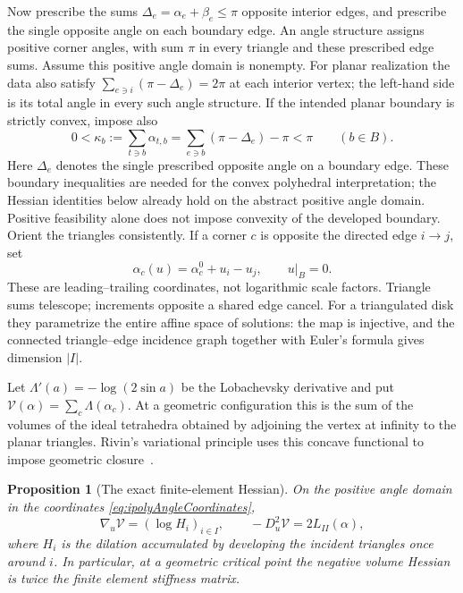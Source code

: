 \documentclass[11pt,a4paper]{article}
\numberwithin{equation}{section}
\newtheorem{proposition}[theorem]{Proposition}
\theoremstyle{definition}
\theoremstyle{remark}
\begin{document}
Now prescribe the sums $\Delta_e=\alpha_e+\beta_e\le\pi$ opposite
interior edges, and prescribe the single opposite angle on each
boundary edge. An angle structure assigns positive corner angles,
with sum $\pi$ in every triangle and these prescribed edge sums.
Assume this positive angle domain is nonempty. For planar realization
the data also satisfy
$\sum_{e\ni i}(\pi-\Delta_e)=2\pi$ at each interior vertex; the
left-hand side is its total angle in every such angle structure.
If the intended planar boundary is strictly convex, impose also
\[
 0<\kappa_b:=\sum_{t\ni b}\alpha_{t,b}
   =\sum_{e\ni b}(\pi-\Delta_e)-\pi<\pi
 \qquad(b\in B).
\]
Here $\Delta_e$ denotes the single prescribed opposite angle on a
boundary edge. These boundary inequalities are needed for the convex
polyhedral interpretation; the Hessian identities below already hold
on the abstract positive angle domain. Positive feasibility alone
does not impose convexity of the developed boundary.
Orient the triangles consistently. If a corner $c$ is opposite the
directed edge $i\to j$, set
\begin{equation}
 \alpha_c(u)=\alpha_c^0+u_i-u_j,\qquad u|_B=0.
 \label{eq:ipolyAngleCoordinates}
\end{equation}
These are leading--trailing coordinates, not logarithmic scale factors.
Triangle sums telescope; increments opposite a shared edge cancel.
For a triangulated disk they parametrize the entire affine space of
solutions: the map is injective, and the connected triangle--edge
incidence graph together with Euler's formula gives dimension $|I|$.

Let $\Lambda'(a)=-\log(2\sin a)$ be the Lobachevsky derivative and put
$\mathcal V(\alpha)=\sum_c\Lambda(\alpha_c)$. At a geometric
configuration this is the sum of the volumes of the ideal tetrahedra
obtained by adjoining the vertex at infinity to the planar triangles.
Rivin's variational principle uses this concave functional to impose
geometric closure~\cite{RivinEuclidean,FuterGueritaud}.

\begin{proposition}[The exact finite-element Hessian]
\label{prop:ipolyHessian}
On the positive angle domain in the coordinates
\eqref{eq:ipolyAngleCoordinates},
\begin{equation}
 \nabla_u\mathcal V=(\log H_i)_{i\in I},\qquad
 -D_u^2\mathcal V=2L_{II}(\alpha),
 \label{eq:ipolyHessian}
\end{equation}
where $H_i$ is the dilation accumulated by developing the incident
triangles once around $i$. In particular, at a geometric critical point
the negative volume Hessian is twice the finite element stiffness matrix.
\end{proposition}
\end{document}
